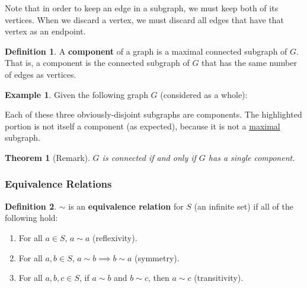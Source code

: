 \documentclass[]{article}
\newtheorem*{theorem}{Theorem}
\theoremstyle{definition}
\newtheorem*{defn}{Definition}
\newtheorem{ex}{Example}[section]
\begin{document}
				Note that in order to keep an edge in a subgraph, we must keep both of its vertices. When we discard a vertex, we must discard all edges that have that vertex as an endpoint.

				\begin{defn}
					A \textbf{component} of a graph is a maximal connected subgraph of $G$. That is, a component is the connected subgraph of $G$ that has the same number of edges as vertices.
				\end{defn}

				\begin{ex}
					Given the following graph $G$ (considered as a whole):
					\begin{center}
					\end{center}

					Each of these three obviously-disjoint subgraphs are components. The highlighted portion is not itself a component (as expected), because it is not a \underline{maximal} subgraph.
				\end{ex}

				\begin{theorem}[Remark]
					$G$ is connected if and only if $G$ has a single component.
				\end{theorem}

			\subsubsection{Equivalence Relations}
				\begin{defn}
					$\mathbf{\sim}$ is an \textbf{equivalence relation} for $S$ (an infinite set) if all of the following hold:
					\begin{enumerate}
						\item For all $a \in S$, $a \sim a$ (reflexivity).
						\item For all $a, b \in S$, $a \sim b \implies b \sim a$ (symmetry).
						\item For all $a, b, c \in S$, if $a \sim b$ and $b \sim c$, then $a \sim c$ (transitivity).
					\end{enumerate}
				\end{defn}
\end{document}
